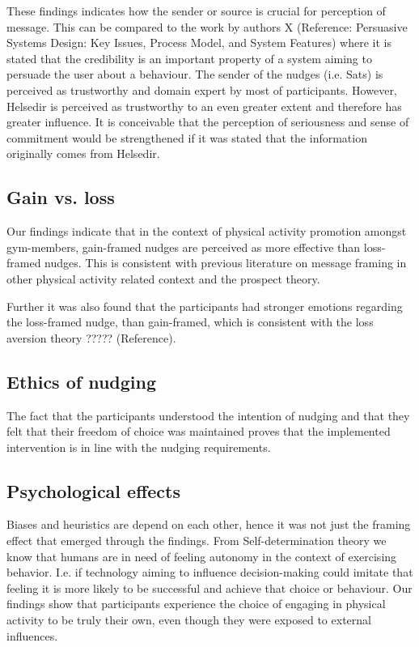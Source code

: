 These findings indicates how the sender or source is crucial for perception of message. This can be compared to the work by authors X \cite{oinas-kukkonen_persuasive_2009} (Reference: Persuasive Systems Design: Key Issues, Process Model, and System Features) where it is stated that the credibility is an important property of a system aiming to persuade the user about a behaviour. The sender of the nudges (i.e. Sats) is perceived as trustworthy and domain expert by most of participants. However, Helsedir is perceived as trustworthy to an even greater extent and therefore has greater influence. It is conceivable that the perception of seriousness and sense of commitment would be strengthened if it was stated that the information originally comes from Helsedir. 

\subsection{Gain vs. loss}
Our findings indicate that in the context of physical activity promotion amongst gym-members, gain-framed nudges are perceived as more effective than loss-framed nudges. This is consistent with previous literature on message framing in other physical activity related context and the prospect theory. 

Further it was also found that the participants had stronger emotions regarding the loss-framed nudge, than gain-framed, which is consistent with the loss aversion theory ????? (Reference). 

\subsection{Ethics of nudging}
The fact that the participants understood the intention of nudging and that they felt that their freedom of choice was maintained proves that the implemented intervention is in line with the nudging requirements.

\subsection{Psychological effects}
Biases and heuristics are depend on each other, hence it was not just the framing effect that emerged through the findings. From Self-determination theory we know that humans are in need of feeling autonomy in the context of exercising behavior. I.e. if technology aiming to influence decision-making could imitate that feeling it is more likely to be successful and achieve that choice or behaviour. Our findings show that participants experience the choice of engaging in physical activity to be truly their own, even though they were exposed to external influences. 

